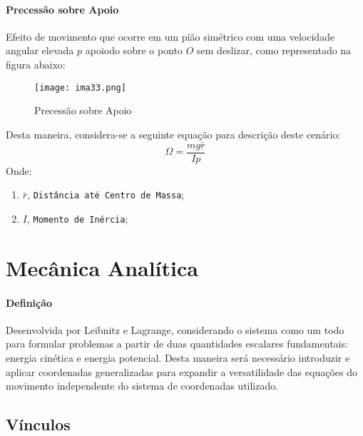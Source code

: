 \documentclass{article}
\begin{document}
            \paragraph{Precessão sobre Apoio}Efeito de movimento que ocorre em um pião simétrico com uma velocidade angular elevada $p$ apoiodo sobre o ponto $O$ sem deslizar, como representado na figura abaixo:
                \begin{figure}[H]
                    \centering
                    \texttt{[image: ima33.png]}
                    \caption{Precessão sobre Apoio}
                \end{figure}
            Desta maneira, considera-se a seguinte equação para descrição deste cenário:
                \begin{equation}
                    \boxed{
                        \Omega = 
                        \frac{mg \bar{r}}{I p}
                    }
                \end{equation}
            Onde:
                \begin{enumerate}[noitemsep]
                    \item $\bar{r}$, \texttt{Distância até Centro de Massa};
                    \item $I$, \texttt{Momento de Inércia};
                \end{enumerate}
\newpage

    \section{Mecânica Analítica}
        \paragraph{Definição}Desenvolvida por Leibnitz e Lagrange, considerando o sistema como um todo para formular problemas a partir de duas quantidades escalares fundamentais: energia cinética e energia potencial. Desta maneira será necessário introduzir e aplicar coordenadas generalizadas para expandir a versatilidade das equações do movimento independente do sistema de coordenadas utilizado.

        \subsection{Vínculos}
\end{document}

